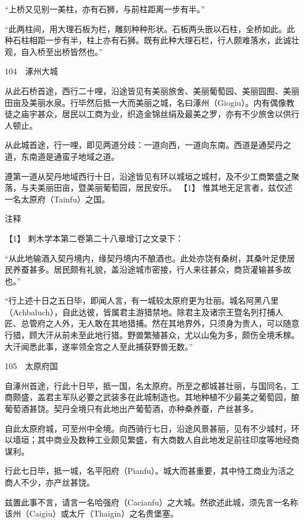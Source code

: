 \documentclass[12pt,UTF8]{ctexbook}
\begin{document}
“上桥又见别一美柱，亦有石狮，与前柱距离一步有半。”

“此两柱间，用大理石板为栏，雕刻种种形状。石板两头嵌以石柱，全桥如此。此种石柱相距一步有半，柱上亦有石狮。既有此种大理石栏，行人颇难落水，此诚壮观，自入桥至出桥皆然也。”





104　涿州大城

从此石桥首途，西行二十哩，沿途皆见有美丽旅舍、美丽葡萄园、美丽园囿、美丽田亩及美丽水泉。行毕然后抵一大而美丽之城，名曰涿州（Giogiu）。内有偶像教徒之庙宇甚众，居民以工商为业，织造金锦丝绢及最美之罗，亦有不少旅舍以供行人顿止。

从此城首途，行一哩，即见两道分歧：一道向西，一道向东南。西道是通契丹之道，东南道是通蛮子地域之道。

遵第一道从契丹地域西行十日，沿途皆见有环以城垣之城村，及不少工商繁盛之聚落，与夫美丽田亩，暨美丽葡萄园，居民安乐。 【1】 惟其地无足言者，兹仅述一名太原府（Tainfu）之国。

注释

【1】 剌木学本第二卷第二十八章增订之文录下：

“从此地输酒入契丹境内，缘契丹境内不酿酒也。此处亦饶有桑树，其桑叶足使居民养蚕甚多。居民颇有礼貌，盖沿途城市密接，行人来往甚众，商货灌输甚多故也。”

“行上述十日之五日毕，即闻人言，有一城较太原府更为壮丽。城名阿黑八里（Achbaluch），自此达彼，皆属君主游猎禁地。除君主及诸宗王暨名列打捕人匠、总管府之人外，无人敢在其地猎捕。然在其地界外，只须身为贵人，可以随意行猎，顾大汗从前未至此地行猎。野兽繁殖甚众，尤以山兔为多，颇伤全境禾稼。大汗闻悉此事，遂率领全宫之人至此捕获野兽无数。”





105　太原府国

自涿州首途，行此十日毕，抵一国，名太原府。所至之都城甚壮丽，与国同名，工商颇盛，盖君主军队必要之武装多在此城制造也。其地种植不少最美之葡萄园，酿葡萄酒甚饶。契丹全境只有此地出产葡萄酒，亦种桑养蚕，产丝甚多。

自此太原府城，可至州中全境。向西骑行七日，沿途风景甚丽，见有不少城村，环以墙垣；其中商业及数种工业颇见繁盛，有大商数人自此地发足前往印度等地经商谋利。

行此七日毕，抵一城，名平阳府（Pianfu）。城大而甚重要，其中恃工商业为活之商人不少，亦产丝甚饶。

兹置此事不言，请言一名哈强府（Cacianfu）之大城。然欲述此城，须先言一名称该州（Caigiu）或太斤（Thaigin）之名贵堡塞。
\end{document}
